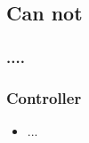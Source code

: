 \subsection{Can not}

\begin{frame}
\frametitle{....}

  
\end{frame}


\begin{frame}
\frametitle{Controller}

  \begin{itemize}
    \item ...
  \end{itemize}
    
\end{frame}